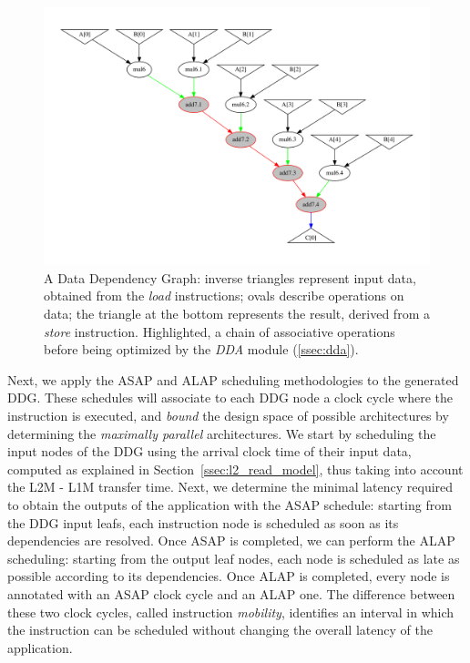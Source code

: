 \begin{figure}[tb]
\centering
\includegraphics[width=.9\columnwidth,left]{images/supernode_2.pdf}
\caption{\small A Data Dependency Graph: inverse triangles represent input data, obtained from the \textit{load} instructions; ovals describe operations on data; the triangle at the bottom represents the result, derived from a \textit{store} instruction. Highlighted, a chain of associative operations before being optimized by the \textit{DDA} module (\ref{ssec:dda}).}
\label{fig:ddg}
\end{figure}

Next, we apply the ASAP and ALAP scheduling methodologies\cite{hwang1991formal} to the generated DDG. These schedules will associate to each DDG node a clock cycle where the instruction is executed, and \textit{bound} the design space of possible architectures by determining the \textit{maximally parallel} architectures. We start by scheduling the input nodes of the DDG using the arrival clock time of their input data, computed as explained in Section~\ref{ssec:l2_read_model}, thus taking into account the L2M - L1M transfer time. Next, we determine the minimal latency required to obtain the outputs of the application with the ASAP schedule: starting from the DDG input leafs, each instruction node is scheduled as soon as its dependencies are resolved.
Once ASAP is completed, we can perform the ALAP scheduling: starting from the output leaf nodes, each node is scheduled as late as possible according to its dependencies. Once ALAP is completed, every node is annotated with an ASAP clock cycle and an ALAP one. The difference between these two clock cycles, called instruction \textit{mobility}, identifies an interval in which the instruction can be scheduled without changing the overall latency of the application.

